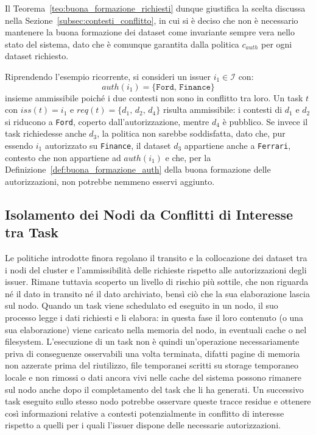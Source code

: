 Il Teorema~\ref{teo:buona_formazione_richiesti} dunque giustifica la scelta discussa nella Sezione~\ref{subsec:contesti_conflitto}, in cui si è deciso che non è necessario mantenere la buona formazione dei dataset come invariante sempre vera nello stato del sistema, dato che è comunque garantita dalla politica $c_{auth}$ per ogni dataset richiesto.

Riprendendo l'esempio ricorrente, si consideri un issuer $i_1 \in \mathcal{I}$ con:
\begin{equation}
    auth(i_1) = \{\mathtt{Ford},\, \mathtt{Finance}\}
\end{equation}
insieme ammissibile poiché i due contesti non sono in conflitto tra loro. Un task $t$ con $iss(t) = i_1$ e $req(t) = \{d_1,\, d_2,\, d_4\}$ risulta ammissibile: i contesti di $d_1$ e $d_2$ si riducono a \texttt{Ford}, coperto dall'autorizzazione, mentre $d_4$ è pubblico. Se invece il task richiedesse anche $d_3$, la politica non sarebbe soddisfatta, dato che, pur essendo $i_1$ autorizzato su \texttt{Finance}, il dataset $d_3$ appartiene anche a \texttt{Ferrari}, contesto che non appartiene ad $auth(i_1)$ e che, per la Definizione~\ref{def:buona_formazione_auth} della buona formazione delle autorizzazioni, non potrebbe nemmeno esservi aggiunto.


\subsection{Isolamento dei Nodi da Conflitti di Interesse tra Task}
\label{subsec:chinese_wall}

Le politiche introdotte finora regolano il transito e la collocazione dei dataset tra i nodi del cluster e l'ammissibilità delle richieste rispetto alle autorizzazioni degli issuer. Rimane tuttavia scoperto un livello di rischio più sottile, che non riguarda né il dato in transito né il dato archiviato, bensì ciò che la sua elaborazione lascia sul nodo. Quando un task viene schedulato ed eseguito in un nodo, il suo processo legge i dati richiesti e li elabora: in questa fase il loro contenuto (o una sua elaborazione) viene caricato nella memoria del nodo, in eventuali cache o nel filesystem. L'esecuzione di un task non è quindi un'operazione necessariamente priva di conseguenze osservabili una volta terminata, difatti pagine di memoria non azzerate prima del riutilizzo, file temporanei scritti su storage temporaneo locale e non rimossi o dati ancora vivi nelle cache del sistema possono rimanere sul nodo anche dopo il completamento del task che li ha generati. Un successivo task eseguito sullo stesso nodo potrebbe osservare queste tracce residue e ottenere così informazioni relative a contesti potenzialmente in conflitto di interesse rispetto a quelli per i quali l'issuer dispone delle necessarie autorizzazioni.

